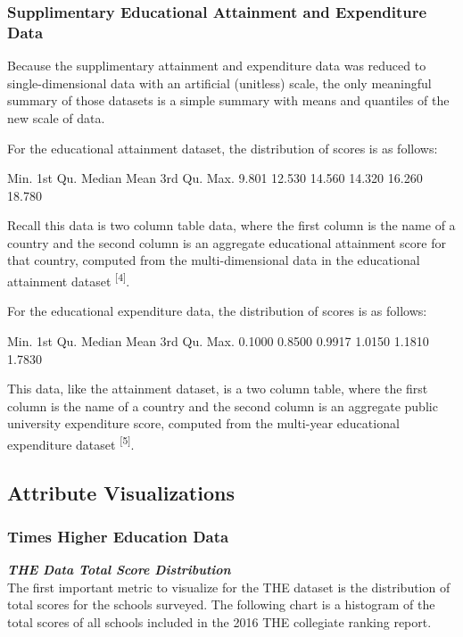 \documentclass[12pt]{article}
\begin{document}
\subsubsection{Supplimentary Educational Attainment and Expenditure Data}

Because the supplimentary attainment and expenditure data was reduced to single-dimensional data with an artificial (unitless) scale, the only meaningful summary of those datasets is a simple summary with means and quantiles of the new scale of data.

For the educational attainment dataset, the distribution of scores is as follows:
\begin{Schunk}
\begin{Soutput}
   Min. 1st Qu.  Median    Mean 3rd Qu.    Max. 
  9.801  12.530  14.560  14.320  16.260  18.780 
\end{Soutput}
\end{Schunk}

Recall this data is two column table data, where the first column is the name of a country and the second column is an aggregate educational attainment score for that country, computed from the multi-dimensional data in the educational attainment dataset \textsuperscript{[4]}.

For the educational expenditure data, the distribution of scores is as follows:
\begin{Schunk}
\begin{Soutput}
   Min. 1st Qu.  Median    Mean 3rd Qu.    Max. 
 0.1000  0.8500  0.9917  1.0150  1.1810  1.7830 
\end{Soutput}
\end{Schunk}

This data, like the attainment dataset, is a two column table, where the first column is the name of a country and the second column is an aggregate public university expenditure score, computed from the multi-year educational expenditure dataset \textsuperscript{[5]}.

\subsection{Attribute Visualizations}

\subsubsection{Times Higher Education Data}

\textbf{\textit{THE Data Total Score Distribution}} \\
The first important metric to visualize for the THE dataset is the distribution of total scores for the schools surveyed. The following chart is a histogram of the total scores of all schools included in the 2016 THE collegiate ranking report.
\end{document}
